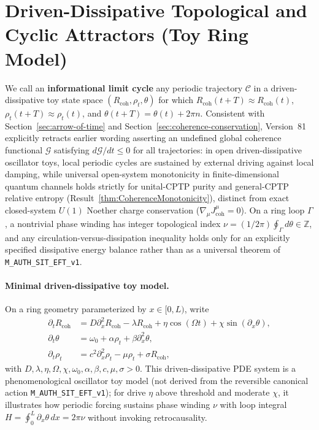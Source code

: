 \section{Driven-Dissipative Topological and Cyclic Attractors (Toy Ring Model)}
\label{appendix:topological-attractors}

We call an \textbf{informational limit cycle} any periodic trajectory $\mathcal{C}$ in a driven-dissipative toy state space $(R_{\mathrm{coh}}, \rho_t, \theta)$ for which $R_{\mathrm{coh}}(t+T) \approx R_{\mathrm{coh}}(t)$, $\rho_t(t+T) \approx \rho_t(t)$, and $\theta(t+T) = \theta(t) + 2\pi n$. Consistent with Section~\ref{sec:arrow-of-time} and Section~\ref{sec:coherence-conservation}, Version~81 explicitly retracts earlier wording asserting an undefined global coherence functional $\mathcal{G}$ satisfying $d\mathcal{G}/dt \le 0$ for all trajectories: in open driven-dissipative oscillator toys, local periodic cycles are sustained by external driving against local damping, while universal open-system monotonicity in finite-dimensional quantum channels holds strictly for unital-CPTP purity and general-CPTP relative entropy (Result~\ref{thm:CoherenceMonotonicity}), distinct from exact closed-system $U(1)$ Noether charge conservation ($\nabla_\mu J^\mu_{\mathrm{coh}} = 0$). On a ring loop $\Gamma$, a nontrivial phase winding has integer topological index $\nu = (1/2\pi)\oint_\Gamma d\theta \in \mathbb{Z}$, and any circulation-versus-dissipation inequality holds only for an explicitly specified dissipative energy balance rather than as a universal theorem of \texttt{M\_AUTH\_SIT\_EFT\_v1}.

\paragraph{Minimal driven-dissipative toy model.} On a ring geometry parameterized by $x \in [0,L)$, write
\begin{align*}
    \partial_t R_{\mathrm{coh}} &= D \partial_x^2 R_{\mathrm{coh}} - \lambda R_{\mathrm{coh}} + \eta \cos(\Omega t) + \chi \sin(\partial_x\theta), \\
    \partial_t \theta &= \omega_0 + \alpha \rho_t + \beta \partial_x^2 \theta, \\
    \partial_t \rho_t &= c^2 \partial_x^2 \rho_t - \mu \rho_t + \sigma R_{\mathrm{coh}},
\end{align*}
with $D,\lambda,\eta,\Omega,\chi,\omega_0,\alpha,\beta,c,\mu,\sigma > 0$. This driven-dissipative PDE system is a phenomenological oscillator toy model (not derived from the reversible canonical action \texttt{M\_AUTH\_SIT\_EFT\_v1}); for drive $\eta$ above threshold and moderate $\chi$, it illustrates how periodic forcing sustains phase winding $\nu$ with loop integral $H = \oint_0^L \partial_x\theta \, dx = 2\pi\nu$ without invoking retrocausality.

